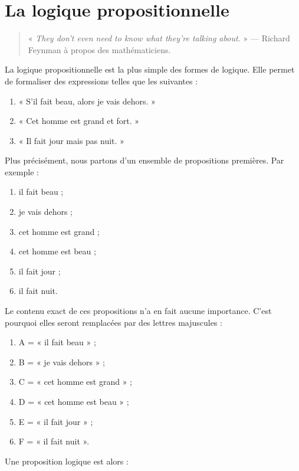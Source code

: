 
\section{La logique propositionnelle}

\begin{quote}
« \textit{\foreignlanguage{english}{They don't even need to know what they're
talking about.}} » --- Richard Feynman à propos des mathématiciens.
\end{quote}

La logique propositionnelle est la plus simple des formes de logique. Elle
permet de formaliser des expressions telles que les suivantes :

\begin{enumerate}
\item « S’il fait beau, alors je vais dehors. »
\item « Cet homme est grand et fort. »
\item « Il fait jour mais pas nuit. »
\end{enumerate}

Plus précisément, nous partons d’un ensemble de propositions
premières. Par exemple :

\begin{enumerate}
\item il fait beau ;
\item je vais dehors ;
\item cet homme est grand ;
\item cet homme est beau ;
\item il fait jour ;
\item il fait nuit.
\end{enumerate}

Le contenu exact de ces propositions n’a en fait aucune importance. C’est
pourquoi elles seront remplacées par des lettres majuscules :

\begin{enumerate}
\item A = « il fait beau » ;
\item B = « je vais dehors » ;
\item C = « cet homme est grand » ;
\item D = « cet homme est beau » ;
\item E = « il fait jour » ;
\item F = « il fait nuit ».
\end{enumerate}

Une proposition logique est alors :

